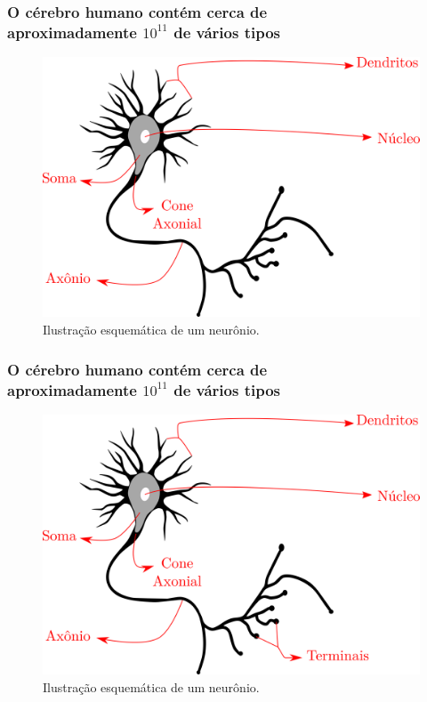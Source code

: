 \documentclass[10pt]{beamer} %
\begin{document}
\begin{frame}
	\frametitle{O cérebro humano contém cerca de \\ aproximadamente $10^{11}$   de vários tipos}
	\begin{figure}
		\centering
		\includegraphics[scale=0.2]{Imagens/cone.png} 
		\caption{Ilustração esquemática de um neurônio.}
	\end{figure}
\end{frame}

\begin{frame}
	\frametitle{O cérebro humano contém cerca de \\ aproximadamente $10^{11}$   de vários tipos}
	\begin{figure}
		\centering
		\includegraphics[scale=0.2]{Imagens/terminal.png} 
		\caption{Ilustração esquemática de um neurônio.}
	\end{figure}
\end{frame}
\end{document}
